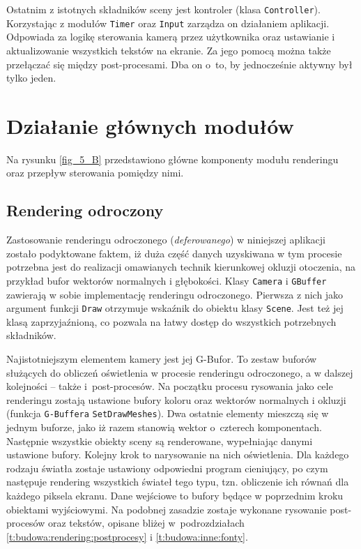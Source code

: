 	Ostatnim z istotnych składników sceny jest kontroler (klasa \texttt{Controller}). Korzystając z modułów \texttt{Timer} oraz \texttt{Input} zarządza on działaniem aplikacji. Odpowiada za logikę sterowania kamerą przez użytkownika oraz ustawianie i aktualizowanie wszystkich tekstów na ekranie. Za jego pomocą można także przełączać się między post-procesami. Dba on o~to, by jednocześnie aktywny był tylko jeden.
	
	\section{Działanie głównych modułów}
	\label{t:budowa:rendering}
			
	
		Na rysunku \ref{fig_5_B} przedstawiono główne komponenty modułu renderingu oraz przepływ sterowania pomiędzy nimi.
		
	
		\subsection{Rendering odroczony}
		\label{t:budowa:rendering:rendering}
		
		
		Zastosowanie renderingu odroczonego (\emph{deferowanego}) w niniejszej aplikacji zostało podyktowane faktem, iż duża część danych uzyskiwana w tym procesie potrzebna jest do realizacji omawianych technik kierunkowej okluzji otoczenia, na przykład bufor wektorów normalnych i głębokości. Klasy \texttt{Camera} i \texttt{GBuffer} zawierają w sobie implementację renderingu odroczonego. Pierwsza z nich jako argument funkcji \texttt{Draw} otrzymuje wskaźnik do obiektu klasy \texttt{Scene}. Jest też jej klasą zaprzyjaźnioną, co pozwala na łatwy dostęp do wszystkich potrzebnych składników.
		
		Najistotniejszym elementem kamery jest jej G-Bufor. To zestaw buforów służących do obliczeń oświetlenia w procesie renderingu odroczonego, a w dalszej kolejności -- także i~post-procesów. Na początku procesu rysowania jako cele renderingu zostają ustawione bufory koloru oraz wektorów normalnych i okluzji (funkcja \texttt{G-Buffera} \texttt{SetDrawMeshes}). Dwa ostatnie elementy mieszczą się w jednym buforze, jako iż razem stanowią wektor o~czterech komponentach. Następnie wszystkie obiekty sceny są renderowane, wypełniając danymi ustawione bufory. Kolejny krok to narysowanie na nich oświetlenia. Dla każdego rodzaju światła zostaje ustawiony odpowiedni program cieniujący, po czym następuje rendering wszystkich świateł tego typu, tzn. obliczenie ich równań dla każdego piksela ekranu. Dane wejściowe to bufory będące w poprzednim kroku obiektami wyjściowymi. Na podobnej zasadzie zostaje wykonane rysowanie post-procesów oraz tekstów, opisane bliżej w~podrozdziałach \ref{t:budowa:rendering:postprocesy} i \ref{t:budowa:inne:fonty}.
		
